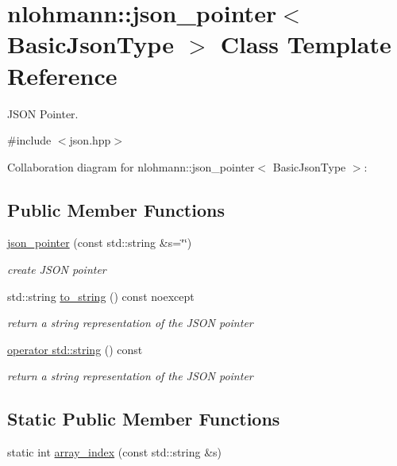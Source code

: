 \hypertarget{classnlohmann_1_1json__pointer}{}\section{nlohmann\+:\+:json\+\_\+pointer$<$ Basic\+Json\+Type $>$ Class Template Reference}
\label{classnlohmann_1_1json__pointer}


J\+S\+ON Pointer.  




{\ttfamily \#include $<$json.\+hpp$>$}



Collaboration diagram for nlohmann\+:\+:json\+\_\+pointer$<$ Basic\+Json\+Type $>$\+:
\subsection*{Public Member Functions}
\begin{DoxyCompactItemize}
\item 
\hyperlink{classnlohmann_1_1json__pointer_a7f32d7c62841f0c4a6784cf741a6e4f8}{json\+\_\+pointer} (const std\+::string \&s=\char`\"{}\char`\"{})
\begin{DoxyCompactList}\small\item\em create J\+S\+ON pointer \end{DoxyCompactList}\item 
std\+::string \hyperlink{classnlohmann_1_1json__pointer_ad7d3a3a215db8fe0964e644a918dcccb}{to\+\_\+string} () const noexcept
\begin{DoxyCompactList}\small\item\em return a string representation of the J\+S\+ON pointer \end{DoxyCompactList}\item 
\hyperlink{classnlohmann_1_1json__pointer_ae9015c658f99cf3d48a8563accc79988}{operator std\+::string} () const
\begin{DoxyCompactList}\small\item\em return a string representation of the J\+S\+ON pointer \end{DoxyCompactList}\end{DoxyCompactItemize}
\subsection*{Static Public Member Functions}
\begin{DoxyCompactItemize}
\item 
static int \hyperlink{classnlohmann_1_1json__pointer_ac53f5b79dd91da78743c437832f57ce4}{array\+\_\+index} (const std\+::string \&s)
\end{DoxyCompactItemize}
